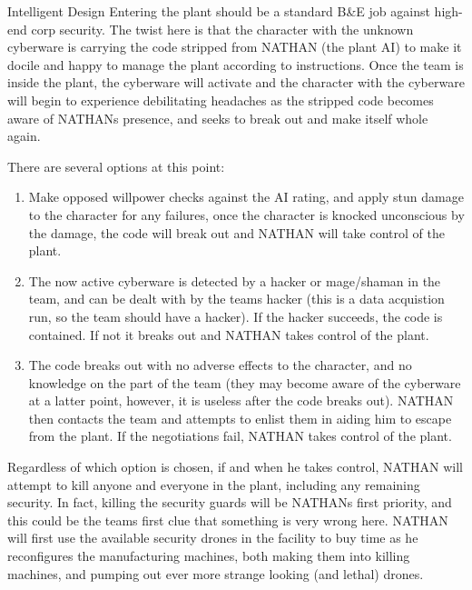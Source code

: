 \begin{scenario}{Intelligent Design}
Entering the plant should be a standard B\&E job against high-end corp security. The twist here is that the character with the unknown cyberware is carrying the code stripped from NATHAN (the plant AI) to make it docile and happy to manage the plant according to instructions. Once the team is inside the plant, the cyberware will activate and the character with the cyberware will begin to experience debilitating headaches as the stripped code becomes aware of NATHANs presence, and seeks to break out and make itself whole again.

There are several options at this point:

\begin{enumerate}
\item Make opposed willpower checks against the AI rating, and apply stun damage to the character for any failures, once the character is knocked unconscious by the damage, the code will break out and NATHAN will take control of the plant.

\item The now active cyberware is detected by a hacker or mage/shaman in the team, and can be dealt with by the teams hacker (this is a data acquistion run, so the team should have a hacker). If the hacker succeeds, the code is contained. If not it breaks out and NATHAN takes control of the plant.

\item The code breaks out with no adverse effects to the character, and no knowledge on the part of the team (they may become aware of the cyberware at a latter point, however, it is useless after the code breaks out). NATHAN then contacts the team and attempts to enlist them in aiding him to escape from the plant. If the negotiations fail, NATHAN takes control of the plant.

\end{enumerate}

Regardless of which option is chosen, if and when he takes control, NATHAN will attempt to kill anyone and everyone in the plant, including any remaining security. In fact, killing the security guards will be NATHANs first priority, and this could be the teams first clue that something is very wrong here. NATHAN will first use the available security drones in the facility to buy time as he reconfigures the manufacturing machines, both making them into killing machines, and pumping out ever more strange looking (and lethal) drones.


\end{scenario}

